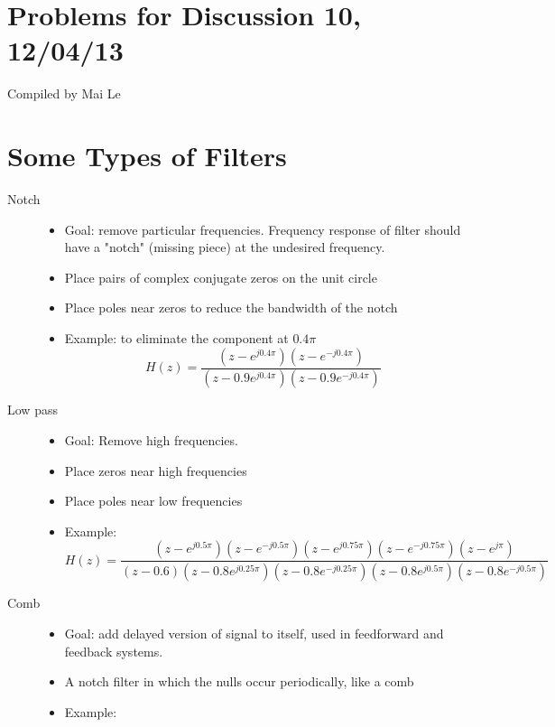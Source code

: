 \documentclass[11pt]{article}
\begin{document}
{\small
\section*{Problems for Discussion 10, 12/04/13}
Compiled by Mai Le
}

\section{Some Types of Filters}

\begin{description}
\item[Notch] 
	\begin{itemize}
	\item Goal: remove particular frequencies. Frequency response of filter should have a "notch" (missing piece) at the undesired frequency.
	\item Place pairs of complex conjugate zeros on the unit circle
	\item Place poles near zeros to reduce the bandwidth of the notch
	\item Example: to eliminate the component at $0.4 \pi$
	\[ H(z) = \frac{(z-e^{j 0.4 \pi})(z-e^{-j0.4 \pi})}{(z-0.9e^{j 0.4 \pi})(z-0.9e^{-j0.4 \pi})} \]
	\end{itemize}
\item[Low pass] 
	\begin{itemize}
	\item Goal: Remove high frequencies.
	\item Place zeros near high frequencies
	\item Place poles near low frequencies
	\item Example:
	\[ H(z) = \frac{(z-e^{j0.5 \pi})(z-e^{-j0.5 \pi})(z-e^{j0.75 \pi})(z-e^{-j0.75 \pi})(z-e^{j \pi})}{(z-0.6)(z-0.8e^{j0.25 \pi})(z-0.8e^{-j0.25 \pi})(z-0.8e^{j0.5 \pi})(z-0.8e^{-j0.5 \pi})} \]
	\end{itemize}
\item[Comb] 
	\begin{itemize}
	\item Goal: add delayed version of signal to itself, used in feedforward and feedback systems.
	\item A notch filter in which the nulls occur periodically, like a comb
	\item Example:
	\vspace{3 cm}
	\end{itemize}
\end{description}
\end{document}
